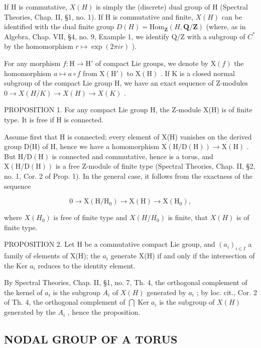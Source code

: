 If H is commutative, \(X(H)\) is simply the (discrete) dual group of H (Spectral Theories, Chap. II, §1, no. 1). If H is commutative and finite, \(X(H)\) can be identified with the dual finite group \(D(H) = \text{Hom}_{\mathbf{Z}}(H, \mathbf{Q}/\mathbf{Z})\) (where, as in Algebra, Chap. VII, §4, no. 9, Example 1, we identify Q/Z with a subgroup of \(C^{*}\) by the homomorphism \(r \mapsto \exp(2\pi ir)\) ).

For any morphism \(f: \mathrm{H} \to \mathrm{H}'\) of compact Lie groups, we denote by \(\mathrm{X}(f)\) the homomorphism \(a \mapsto a \circ f\) from \(\mathrm{X}(\mathrm{H}')\) to \(\mathrm{X}(\mathrm{H})\) . If \(\mathrm{K}\) is a closed normal subgroup of the compact Lie group H, we have an exact sequence of Z-modules \(0 \rightarrow X(H/K) \rightarrow X(H) \rightarrow X(K)\) .

PROPOSITION 1. For any compact Lie group H, the Z-module X(H) is of finite type. It is free if H is connected.

Assume first that H is connected; every element of X(H) vanishes on the derived group D(H) of H, hence we have a homomorphism \(\mathrm{X}(\mathrm{H}/\mathrm{D}(\mathrm{H}))\to\mathrm{X}(\mathrm{H})\) . But \(\mathrm{H}/\mathrm{D}(\mathrm{H})\) is connected and commutative, hence is a torus, and \(\mathrm{X}(\mathrm{H}/\mathrm{D}(\mathrm{H}))\) is a free Z-module of finite type (Spectral Theories, Chap. II, §2, no. 1, Cor. 2 of Prop. 1). In the general case, it follows from the exactness of the sequence

\[
0 \to \mathrm{X} (\mathrm{H} / \mathrm{H} _ {0}) \to \mathrm{X} (\mathrm{H}) \to \mathrm{X} (\mathrm{H} _ {0}),
\]

where \(X(H_{0})\) is free of finite type and \(X(H/H_{0})\) is finite, that \(X(H)\) is of finite type.

PROPOSITION 2. Let H be a commutative compact Lie group, and \((a_{i})_{i\in I}\) a family of elements of X(H); the \(a_{i}\) generate X(H) if and only if the intersection of the Ker \(a_{i}\) reduces to the identity element.

By Spectral Theories, Chap. II, §1, no. 7, Th. 4, the orthogonal complement of the kernel of \(a_i\) is the subgroup \(A_i\) of \(X(H)\) generated by \(a_i\) ; by loc. cit., Cor. 2 of Th. 4, the orthogonal complement of \(\bigcap \operatorname{Ker} a_i\) is the subgroup of \(X(H)\) generated by the \(A_i\) , hence the proposition.

\subsection{NODAL GROUP OF A TORUS}

